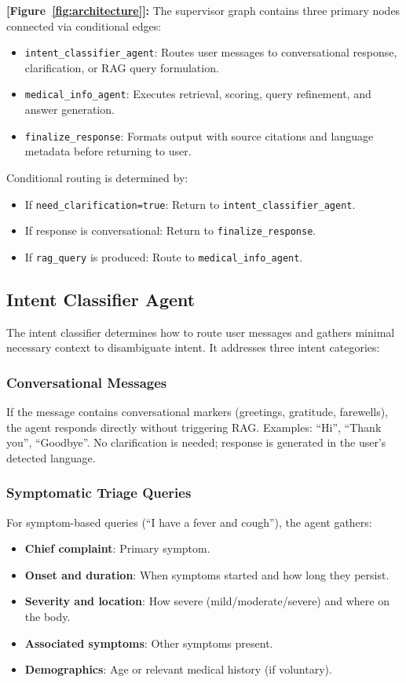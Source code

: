 \documentclass[11pt,a4paper]{article}
\begin{document}
\textbf{[Figure~\ref{fig:architecture}]:} The supervisor graph contains three primary nodes connected via conditional edges:

\begin{itemize}
    \item \texttt{intent\_classifier\_agent}: Routes user messages to conversational response, clarification, or RAG query formulation.
    \item \texttt{medical\_info\_agent}: Executes retrieval, scoring, query refinement, and answer generation.
    \item \texttt{finalize\_response}: Formats output with source citations and language metadata before returning to user.
\end{itemize}

Conditional routing is determined by:
\begin{itemize}
    \item If \texttt{need\_clarification=true}: Return to \texttt{intent\_classifier\_agent}.
    \item If response is conversational: Return to \texttt{finalize\_response}.
    \item If \texttt{rag\_query} is produced: Route to \texttt{medical\_info\_agent}.
\end{itemize}

\subsection{Intent Classifier Agent}
\label{sec:intention-classifier}

The intent classifier determines how to route user messages and gathers minimal necessary context to disambiguate intent. It addresses three intent categories:

\subsubsection{Conversational Messages}
If the message contains conversational markers (greetings, gratitude, farewells), the agent responds directly without triggering RAG. Examples: ``Hi'', ``Thank you'', ``Goodbye''. No clarification is needed; response is generated in the user's detected language.

\subsubsection{Symptomatic Triage Queries}
For symptom-based queries (``I have a fever and cough''), the agent gathers:
\begin{itemize}
    \item \textbf{Chief complaint}: Primary symptom.
    \item \textbf{Onset and duration}: When symptoms started and how long they persist.
    \item \textbf{Severity and location}: How severe (mild/moderate/severe) and where on the body.
    \item \textbf{Associated symptoms}: Other symptoms present.
    \item \textbf{Demographics}: Age or relevant medical history (if voluntary).
\end{itemize}
\end{document}
